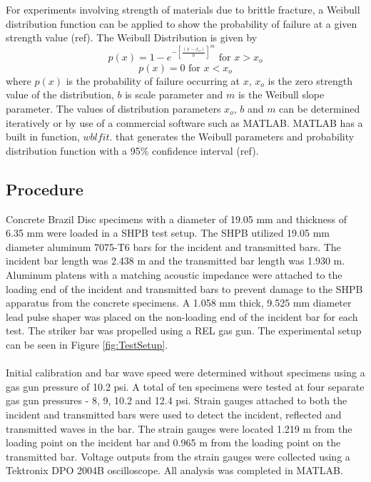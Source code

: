 \documentclass[12pt]{article}
\begin{document}
For experiments involving strength of materials due to brittle fracture, a Weibull distribution function can be applied to show the probability of failure at a given strength value (ref). The Weibull Distribution is given by
\begin{equation}
p(x) = 1-e^{-\left[\frac{\left(x-x_{o}\right)}{b}\right]^m} \text{ for } x > x_{o}
\end{equation}
\begin{equation}
p(x) = 0  \text { for } x < x_{o}
\end{equation} 
where $p(x)$ is the probability of failure occurring at $x$, $x_{o}$ is the zero strength value of the distribution, $b$ is scale parameter and $m$ is the Weibull slope parameter. The values of distribution parameters $x_{o}$, $b$ and $m$ can be determined iteratively or by use of a commercial software such as MATLAB. MATLAB has a built in function, $wblfit$. that generates the Weibull parameters and probability distribution function with a 95\% confidence interval (ref).

\subsection{Procedure} %

Concrete Brazil Disc specimens with a diameter of 19.05 mm and thickness of 6.35 mm were loaded in a SHPB test setup. The SHPB utilized 19.05 mm diameter aluminum 7075-T6 bars for the incident and transmitted bars. The incident bar length was 2.438 m and the transmitted bar length was 1.930 m. Aluminum platens with a matching acoustic impedance were attached to the loading end of the incident and transmitted bars to prevent damage to the SHPB apparatus from the concrete specimens. A 1.058 mm thick, 9.525 mm diameter lead pulse shaper was placed on the non-loading end of the incident bar for each test. The striker bar was propelled using a REL gas gun. The experimental setup can be seen in Figure \ref{fig:TestSetup}.
\\ \\
Initial calibration and bar wave speed were determined without specimens using a gas gun pressure of 10.2 psi. A total of ten specimens were tested at four separate gas gun pressures - 8, 9, 10.2 and 12.4 psi. Strain gauges attached to both the incident and transmitted bars were used to detect the incident, reflected and transmitted waves in the bar. The strain gauges were located 1.219 m from the loading point on the incident bar and 0.965 m from the loading point on the transmitted bar. Voltage outputs from the strain gauges were collected using a Tektronix DPO 2004B oscilloscope. All analysis was completed in MATLAB.   
\end{document}
